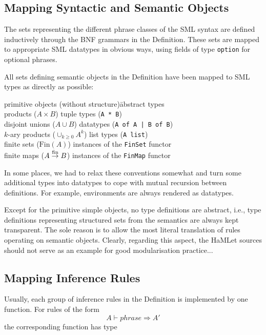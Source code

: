 \documentclass[twoside,titlepage]{article}
\begin{document}
\subsection{Mapping Syntactic and Semantic Objects}
\label{mapping}

The sets representing the different phrase classes of the SML syntax are defined inductively through the BNF grammars in the Definition. These sets are mapped to appropriate SML datatypes in obvious ways, using fields of type {\tt option} for optional phrases.

All sets defining semantic objects in the Definition have been mapped to SML types as directly as possible:

\begin{quoting}
\begin{tabbing}
primitive objects (without structure)\qquad\= abstract types \\
products ($A \times B$)			\> tuple types ({\tt A * B}) \\
disjoint unions ($A \cup B$)		\> datatypes ({\tt A of A | B of B}) \\
$k$-ary products ($\cup_{k\geq0} A^k$)	\> list types ({\tt A list}) \\
finite sets ($\mbox{Fin}(A)$)		\> instances of the {\tt FinSet} functor \\
finite maps ($A \stackrel{\mbox{\scriptsize fin}}{\rightarrow} B$)		\> instances of the {\tt FinMap} functor
\end{tabbing}
\end{quoting}

In some places, we had to relax these conventions somewhat and turn some additional types into datatypes to cope with mutual recursion between definitions. For example, environments are always rendered as datatypes.

Except for the primitive simple objects, no type definitions are abstract, i.e., type definitions representing structured sets from the semantics are always kept transparent. The sole reason is to allow the most literal translation of rules operating on semantic objects. Clearly, regarding this aspect, the HaMLet sources should not serve as an example for good modularisation practice...


\subsection{Mapping Inference Rules}
\label{mappingrules}

Usually, each group of inference rules in the Definition is implemented by one function. For rules of the form
%
\begin{displaymath}
A \vdash \mathit{phrase} \Rightarrow A'
\end{displaymath}
%
the corresponding function has type
\end{document}
